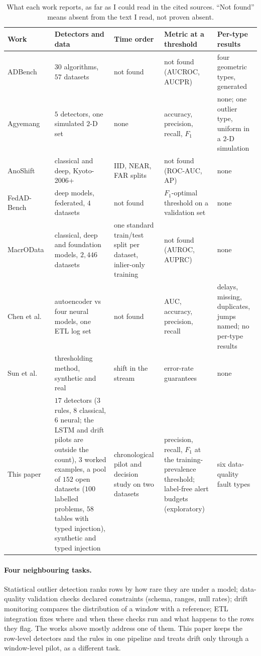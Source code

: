 \documentclass[conference]{IEEEtran}
\begin{document}
\begin{table}[t]
\caption{What each work reports, as far as I could read in the cited sources.
``Not found'' means absent from the text I read, not proven absent.}
\label{tab:positioning}
\centering
\footnotesize
\begin{tabular}{p{2.4cm}p{3.4cm}p{3.0cm}p{2.6cm}p{3.0cm}}
\toprule
Work & Detectors and data & Time order & Metric at a threshold & Per-type results \\
\midrule
ADBench~\cite{han2022adbench} & $30$ algorithms, $57$ datasets & not found & not found (AUCROC, AUCPR) & four geometric types, generated \\
Agyemang~\cite{agyemang2024anomaly} & $5$ detectors, one simulated $2$-D set & none & accuracy, precision, recall, $F_1$ & none; one outlier type, uniform in a $2$-D simulation \\
AnoShift~\cite{dragoi2022anoshift} & classical and deep, Kyoto-2006+ & IID, NEAR, FAR splits & not found (ROC-AUC, AP) & none \\
FedAD-Bench~\cite{anwar2024fedadbench} & deep models, federated, $4$ datasets & not found & $F_1$-optimal threshold on a validation set & none \\
MacrOData~\cite{ding2026macrodata} & classical, deep and foundation models, $2{,}446$ datasets & one standard train/test split per dataset, inlier-only training & not found (AUROC, AUPRC) & none \\
Chen et al.~\cite{chen2025etlautoencoder} & autoencoder vs four neural models, one ETL log set & not found & AUC, accuracy, precision, recall & delays, missing, duplicates, jumps named; no per-type results \\
Sun et al.~\cite{sun2024online} & thresholding method, synthetic and real & shift in the stream & error-rate guarantees & none \\
\midrule
This paper & $17$ detectors ($3$ rules, $8$ classical, $6$ neural; the LSTM and drift pilots are outside the count), $3$ worked examples, a pool of $152$ open datasets ($100$ labelled problems, $58$ tables with typed injection), synthetic and typed injection & chronological pilot and decision study on two datasets & precision, recall, $F_1$ at the training-prevalence threshold; label-free alert budgets (exploratory) & six data-quality fault types \\
\bottomrule
\end{tabular}
\end{table}

\paragraph{Four neighbouring tasks.} Statistical outlier detection ranks rows by how rare they are
under a model; data-quality validation checks declared constraints (schema, ranges, null rates);
drift monitoring compares the distribution of a window with a reference; ETL integration fixes where
and when these checks run and what happens to the rows they flag. The works above mostly address one of
them. This paper keeps the row-level detectors and the rules in one pipeline and treats drift only
through a window-level pilot, as a different task.
\end{document}

